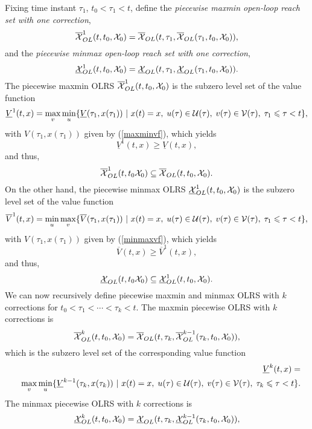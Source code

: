 Fixing time instant $\tau_1$, $t_0<\tau_1<t$, define the
\emph{piecewise maxmin open-loop reach set with one correction},
\begin{equation}
\OXOL^1(t, t_0, \XX_0) = \OXOL(t, \tau_1, \OXOL(\tau_1, t_0, \XX_0)),
\label{maxmin1}
\end{equation}
and the \emph{piecewise minmax open-loop reach set with one correction},
\begin{equation}
\UXOL^1(t, t_0, \XX_0) = \UXOL(t, \tau_1, \UXOL(\tau_1, t_0, \XX_0)).
\label{minmax1}
\end{equation}
The piecewise maxmin OLRS $\OXOL^1(t, t_0, \XX_0)$ is the subzero level set
of the value function
\begin{equation}
\underline{V}^1(t, x) =
\max_v\min_u\{\underline{V}(\tau_1, x(\tau_1)) ~|~ x(t)=x, \;
u(\tau)\in\UU(\tau), \; v(\tau)\in\VV(\tau), \; \tau_1\leq\tau<t\},
\label{maxminvf1}
\end{equation}
with $V(\tau_1, x(\tau_1))$ given by (\ref{maxminvf}), which yields
\[ \underline{V}^1(t, x) \geq \underline{V}(t, x), \]
and thus,
\[ \OXOL^1(t, t_0 \XX_0) \subseteq \OXOL(t, t_0, \XX_0) .\]
On the other hand, the piecewise minmax OLRS $\UXOL^1(t, t_0, \XX_0)$
is the subzero level set of the value function
\begin{equation}
\overline{V}^1(t, x) =
\min_u\max_v\{\overline{V}(\tau_1, x(\tau_1)) ~|~ x(t)=x, \;
u(\tau)\in\UU(\tau), \; v(\tau)\in\VV(\tau), \; \tau_1\leq\tau<t\},
\label{minmaxvf1}
\end{equation}
with $V(\tau_1, x(\tau_1))$ given by (\ref{minmaxvf}), which yields
\[ \overline{V}(t, x) \geq \overline{V}^1(t, x), \]
and thus,
\[ \UXOL(t, t_0 \XX_0) \subseteq \UXOL^1(t, t_0, \XX_0) .\]
We can now recursively define piecewise maxmin and minmax OLRS with
$k$ corrections for $t_0<\tau_1<\cdots<\tau_k<t$.
The maxmin piecewise OLRS with $k$ corrections is
\begin{equation}
\OXOL^k(t, t_0, \XX_0) =
\OXOL(t, \tau_k, \OXOL^{k-1}(\tau_k, t_0, \XX_0)),
\label{maxmink}
\end{equation}
which is the subzero level set of the corresponding value function
\begin{eqnarray}
&&\underline{V}^k(t, x) = \nonumber \\
&&\max_v\min_u\{\underline{V}^{k-1}(\tau_k, x(\tau_k)) ~|~ x(t)=x, \;
u(\tau)\in\UU(\tau), \; v(\tau)\in\VV(\tau), \; \tau_k\leq\tau<t\}.
\label{maxminvfk}
\end{eqnarray}
The minmax piecewise OLRS with $k$ corrections is
\begin{equation}
\UXOL^k(t, t_0, \XX_0) =
\UXOL(t, \tau_k, \UXOL^{k-1}(\tau_k, t_0, \XX_0)),
\label{minmaxk}
\end{equation}
